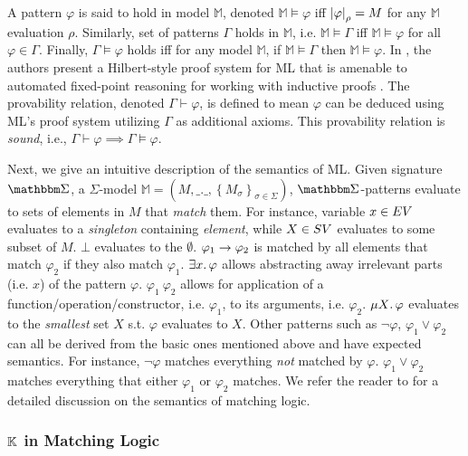 A pattern $\varphi$ is said to hold in model $\mathbb{M}$, denoted $\mathbb{M} \vDash \varphi$ iff
$\left|\varphi\right|_{\rho} = M$ for any $\mathbb{M}$ evaluation $\rho$. Similarly,
set of patterns $\Gamma$ holds in $\mathbb{M}$, i.e. $\mathbb{M} \vDash \Gamma$
iff $\mathbb{M} \vDash \varphi$ for all $\varphi \in \Gamma$.
Finally, $\Gamma \vDash \varphi$ holds iff for any model $\mathbb{M}$,
if $\mathbb{M} \vDash \Gamma$ then $\mathbb{M} \vDash \varphi$.
In \cite{ChenTR19}, the authors present a Hilbert-style proof system
for ML that is amenable to automated fixed-point reasoning for working with
inductive proofs \cite{ChenOOPSLA20}. The provability relation, denoted
$\Gamma \vdash \varphi$, is defined to mean $\varphi$ can be deduced using
ML's proof system utilizing $\Gamma$ as additional axioms. This
provability relation is \emph{sound}, i.e., $\Gamma \vdash \varphi \implies \Gamma
\vDash \varphi$.

Next, we give an intuitive description of the semantics of ML.
Given signature $\MLSigma$, a $\Sigma$-model
$\mathbb{M} = \left(M,\_.\_,\left\{M_{\sigma}\right\}_{\sigma \in \Sigma}\right)$,
$\MLSigma$-patterns evaluate to sets of elements in $M$ that \emph{match} them.
For instance, variable $x \in EV$ evaluates to a \emph{singleton}
containing \emph{element}, while $X \in SV$ evaluates to some subset of $M$. $\bot$
evaluates to the $\emptyset$.
$\varphi_1 \to \varphi_2$ is matched by all elements that match $\varphi_2$
if they also match $\varphi_1$. $\exists x \mathord{.\,} \varphi$ allows abstracting
away irrelevant parts (i.e. $x$) of the pattern $\varphi$. $\varphi_1\
\varphi_2$ allows for application of a function/operation/constructor,
i.e. $\varphi_1$, to its arguments, i.e. $\varphi_2$. $\mu X \mathord{.\,} \varphi$
evaluates to the \emph{smallest} set $X$ s.t. $\varphi$ evaluates to $X$.
Other patterns such as $\neg \varphi$, $\varphi_1 \vee \varphi_2$ can all be
derived from the basic ones mentioned above and have expected semantics.
For instance, $\neg \varphi$ matches everything \emph{not} matched by
$\varphi$. $\varphi_1 \vee \varphi_2$ matches everything that either
$\varphi_1$ or $\varphi_2$ matches. We refer the reader to \cite{ChenTR20}
for a detailed discussion on the semantics of matching logic.

\subsubsection{$\mathbb{K}$ in Matching Logic}

